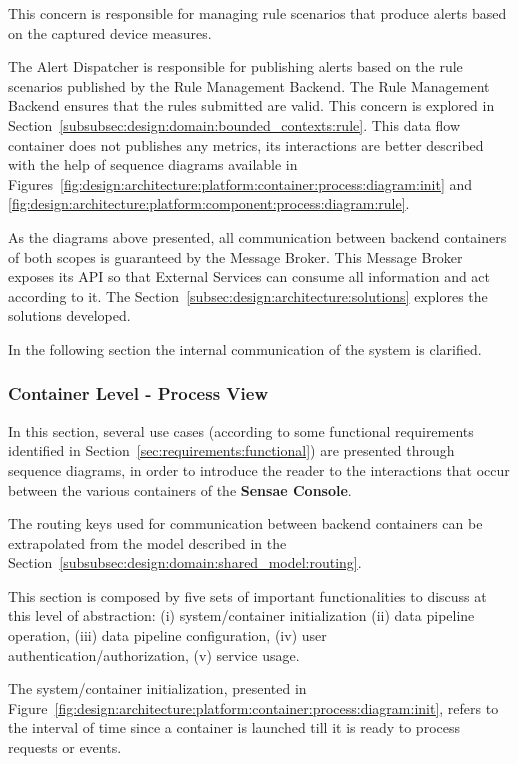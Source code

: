 This concern is responsible for managing rule scenarios that produce alerts based on the captured device measures.

The Alert Dispatcher is responsible for publishing alerts based on the rule scenarios published by the Rule Management Backend. The Rule Management Backend ensures that the rules submitted are valid. This concern is explored in Section~\ref{subsubsec:design:domain:bounded_contexts:rule}. This data flow container does not publishes any metrics, its interactions are better described with the help of sequence diagrams available in Figures~\ref{fig:design:architecture:platform:container:process:diagram:init} and \ref{fig:design:architecture:platform:component:process:diagram:rule}.

As the diagrams above presented, all communication between backend containers of both scopes is guaranteed by the Message Broker. This Message Broker exposes its \gls{API} so that External Services can consume all information and act according to it. The Section~\ref{subsec:design:architecture:solutions} explores the solutions developed.

In the following section the internal communication of the system is clarified.

\subsubsection{Container Level - Process View}
\label{par:design:architecture:platform:container:process}

In this section, several use cases (according to some functional requirements identified in Section~\ref{sec:requirements:functional}) are presented through sequence diagrams, in order to introduce the reader to the interactions that occur between the various containers of the \textbf{Sensae Console}.

The routing keys used for communication between backend containers can be extrapolated from the model described in the Section~\ref{subsubsec:design:domain:shared_model:routing}.

This section is composed by five sets of important functionalities to discuss at this level of abstraction: (i) system/container initialization (ii) data pipeline operation, (iii) data pipeline configuration, (iv) user authentication/authorization, (v) service usage.

The system/container initialization, presented in Figure~\ref{fig:design:architecture:platform:container:process:diagram:init}, refers to the interval of time since a container is launched till it is ready to process requests or events.

